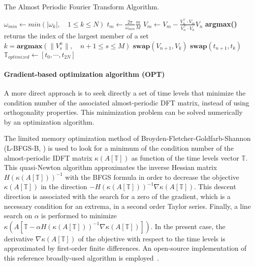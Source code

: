 \begin{algorithm}[htb]
\caption{The Almost Periodic Fourier Transform Algorithm.}
\label{alg:algo_APFT}
\begin{algorithmic}
\STATE $\omega_{min} \leftarrow min \left( |\omega_k |,\quad 1 \leqslant k \leqslant N \right)$
    \STATE $t_m \leftarrow \displaystyle\frac{2\pi}{\omega_{min}}\frac{m}{M}$
\ENDFOR
{}
  \STATE $ V_{m} \leftarrow V_{m} - \displaystyle\frac{V_{n}^\top \cdot V_{m}}{V_{n}^\top \cdot V_{n}} V_{n}$
   \ENDFOR
   \STATE \textbf{argmax()} returns the index of the largest member of a set
   \STATE $k=\textbf{argmax} \left( \| V_s^n \|,\quad n+1\leqslant s \leqslant M\right) $
   \STATE $\textbf{swap}(V_{n+1},V_{k})$
   \STATE $\textbf{swap}(t_{n+1},t_{k})$
\ENDFOR
\STATE $\mathbb{T}_{optimized} \leftarrow [t_0, \cdots, t_{2N}]$
\end{algorithmic}
\end{algorithm}

\paragraph{Gradient-based optimization algorithm (OPT)}
A more direct approach is to seek directly a set of time levels
that minimize the condition number of the associated almost-periodic DFT matrix, 
instead of using orthogonality properties. 
This minimization problem can be solved numerically by 
an optimization algorithm.

The limited memory optimization method of
Broyden-Fletcher-Goldfarb-Shannon (L-BFGS-B, \cite{Byrd1995}) is
used to look for a minimum of the condition number of the
almost-periodic IDFT matrix $\kappa \left(A \left[\mathbb{T} \right]
\right)$ as function of the time levels vector $\mathbb{T}$.  This
quasi-Newton algorithm approximates the inverse Hessian matrix
$H(\kappa \left(A \left[\mathbb{T} \right] \right))^{-1}$ with the
BFGS formula in order to decrease the objective $\kappa \left(A
  \left[\mathbb{T} \right] \right)$ in the direction $-H(\kappa
\left(A \left[\mathbb{T} \right] \right))^{-1}\nabla \kappa \left(A
  \left[\mathbb{T} \right] \right)$.  This descent direction is
associated with the search for a zero of the gradient, which is a
necessary condition for an extrema, in a second order Taylor series.
Finally, a line search on $\alpha$ is performed to minimize $\kappa
\left(A \left[\mathbb{T} - \alpha H(\kappa \left(A \left[\mathbb{T}
      \right] \right))^{-1} \nabla \kappa \left(A \left[\mathbb{T}
      \right] \right) \right] \right)$.  In the present case, the
derivative $\nabla \kappa \left(A \left[\mathbb{T} \right] \right)$ of
the objective with respect to the time levels is approximated by
first-order finite differences.  An open-source implementation of this
reference broadly-used algorithm is
employed~\cite{Nocedal1980}.

